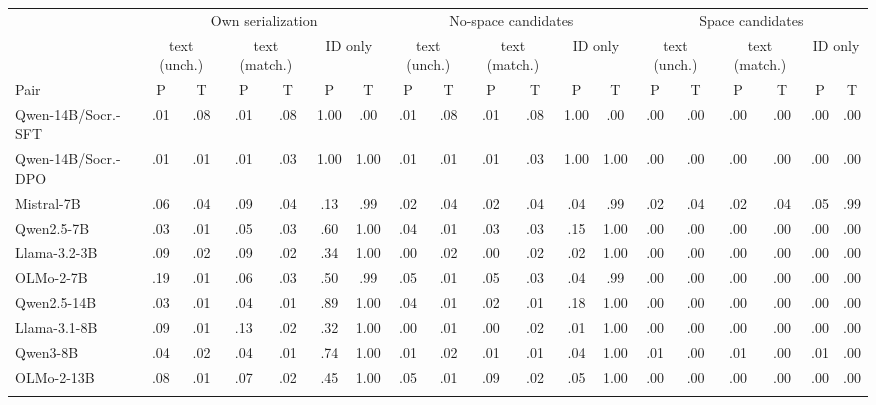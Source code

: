 \begin{table}[t]
\centering\scriptsize
\setlength{\tabcolsep}{2.5pt}
\begin{tabular}{@{}lcccccccccccccccccc@{}}
\toprule
& \multicolumn{6}{c}{Own serialization} & \multicolumn{6}{c}{No-space candidates} & \multicolumn{6}{c}{Space candidates} \\
\cmidrule(lr){2-7}\cmidrule(lr){8-13}\cmidrule(l){14-19}
& \multicolumn{2}{c}{text (unch.)} & \multicolumn{2}{c}{text (match.)} & \multicolumn{2}{c}{ID only} & \multicolumn{2}{c}{text (unch.)} & \multicolumn{2}{c}{text (match.)} & \multicolumn{2}{c}{ID only} & \multicolumn{2}{c}{text (unch.)} & \multicolumn{2}{c}{text (match.)} & \multicolumn{2}{c}{ID only} \\
Pair & P & T & P & T & P & T & P & T & P & T & P & T & P & T & P & T & P & T \\
\midrule
Qwen-14B/Socr.-SFT & .01 & .08 & .01 & .08 & 1.00 & .00 & .01 & .08 & .01 & .08 & 1.00 & .00 & .00 & .00 & .00 & .00 & .00 & .00 \\
Qwen-14B/Socr.-DPO & .01 & .01 & .01 & .03 & 1.00 & 1.00 & .01 & .01 & .01 & .03 & 1.00 & 1.00 & .00 & .00 & .00 & .00 & .00 & .00 \\
\addlinespace[2pt]
Mistral-7B & .06 & .04 & .09 & .04 & .13 & .99 & .02 & .04 & .02 & .04 & .04 & .99 & .02 & .04 & .02 & .04 & .05 & .99 \\
Qwen2.5-7B & .03 & .01 & .05 & .03 & .60 & 1.00 & .04 & .01 & .03 & .03 & .15 & 1.00 & .00 & .00 & .00 & .00 & .00 & .00 \\
Llama-3.2-3B & .09 & .02 & .09 & .02 & .34 & 1.00 & .00 & .02 & .00 & .02 & .02 & 1.00 & .00 & .00 & .00 & .00 & .00 & .00 \\
OLMo-2-7B & .19 & .01 & .06 & .03 & .50 & .99 & .05 & .01 & .05 & .03 & .04 & .99 & .00 & .00 & .00 & .00 & .00 & .00 \\
\addlinespace[2pt]
Qwen2.5-14B & .03 & .01 & .04 & .01 & .89 & 1.00 & .04 & .01 & .02 & .01 & .18 & 1.00 & .00 & .00 & .00 & .00 & .00 & .00 \\
Llama-3.1-8B & .09 & .01 & .13 & .02 & .32 & 1.00 & .00 & .01 & .00 & .02 & .01 & 1.00 & .00 & .00 & .00 & .00 & .00 & .00 \\
Qwen3-8B & .04 & .02 & .04 & .01 & .74 & 1.00 & .01 & .02 & .01 & .01 & .04 & 1.00 & .01 & .00 & .01 & .00 & .01 & .00 \\
OLMo-2-13B & .08 & .01 & .07 & .02 & .45 & 1.00 & .05 & .01 & .09 & .02 & .05 & 1.00 & .00 & .00 & .00 & .00 & .00 & .00 \\
\addlinespace[2pt]

\end{tabular}
\end{table}
